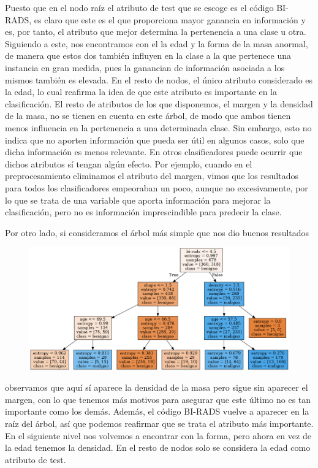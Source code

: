 \documentclass[a4paper,11pt]{article}
\begin{document}
Puesto que en el nodo raíz el atributo de test que se escoge es el código BI-RADS, es claro que este es el que proporciona mayor ganancia en información y es, por tanto, el atributo que mejor determina la pertenencia a una clase u otra. Siguiendo a este, nos encontramos con el la edad y la forma de la masa anormal, de manera que estos dos también influyen en la clase a la que pertenece una instancia en gran medida, pues la ganancian de información asociada a los mismos también es elevada. En el resto de nodos, el único atributo considerado es la edad, lo cual reafirma la idea de que este atributo es importante en la clasificación. El resto de atributos de los que disponemos, el margen y la densidad de la masa, no se tienen en cuenta en este árbol, de modo que ambos tienen menos influencia en la pertenencia a una determinada clase. Sin embargo, esto no indica que no aporten información que pueda ser útil en algunos casos, solo que dicha información es menos relevante. En otros clasificadores puede ocurrir que dichos atributos sí tengan algún efecto. Por ejemplo, cuando en el preprocesamiento eliminamos el atributo del margen, vimos que los resultados para todos los clasificadores empeoraban un poco, aunque no excesivamente, por lo que se trata de una variable que aporta información para mejorar la clasificación, pero no es información imprescindible para predecir la clase. 

Por otro lado, si consideramos el árbol más simple que nos dio buenos resultados
\begin{figure}[H]
	\centering
	\includegraphics[width=1.1\linewidth]{img/decision_tree2}
	\caption{}
	\label{fig:decisiontree2}
\end{figure}


observamos que aquí sí aparece la densidad de la masa pero sigue sin aparecer el margen, con lo que tenemos más motivos para asegurar que este último no es tan importante como los demás. Además, el código BI-RADS vuelve a aparecer en la raíz del árbol, así que podemos reafirmar que se trata el atributo más importante. En el siguiente nivel nos volvemos a encontrar con la forma, pero ahora en vez de la edad tenemos  la densidad. En el resto de nodos solo se considera la edad como atributo de test.
\end{document}
